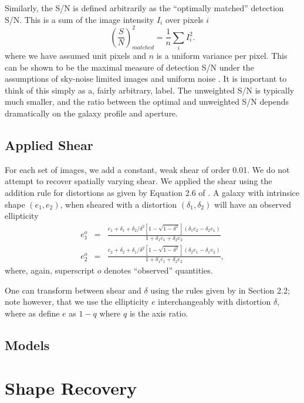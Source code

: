 \documentclass[12pt,preprint]{aastex}
\begin{document}
Similarly, the S/N is defined arbitrarily as the ``optimally matched''
detection S/N.  This is a sum of the image intensity $I_i$ over pixels $i$
\begin{equation}
\left(\frac{S}{N}\right)^2_{matched} = \frac{1}{n} \sum_{i} I_i^2.
\end{equation}
where we have assumed unit pixels and $n$ is a uniform variance per pixel.
This can be shown to be the maximal measure of detection S/N under the
assumptions of sky-noise limited images and uniform noise \citep{plazasthesis}.
It is important to think of this simply as a, fairly arbitrary, label.  The
unweighted S/N is typically much smaller, and the ratio between the optimal and
unweighted S/N depends dramatically on the galaxy profile and aperture.

\subsection{Applied Shear} \label{sec:sim:shear}

For each set of images, we add a constant, weak shear of order 0.01.  We do not
attempt to recover spatially varying shear.  We applied the shear using the
addition rule for distortions as given by Equation 2.6 of
\citet{Escude91}. A galaxy with intrinsice shape $(e_1,e_2)$, when
sheared with a distortion $(\delta_1, \delta_2)$ will have an observed
ellipticity
\begin{eqnarray}
e_1^o  & = & \frac
{e_1 + \delta_1 + \delta_2/\delta^2\left[1 - \sqrt{1-\delta^2}\right]\left( \delta_1 e_2 - \delta_2 e_1\right)}
{1 + \delta_1 e_1 + \delta_2 e_2 } \\
e_2^o  & = & \frac
{e_2 + \delta_2 + \delta_1/\delta^2\left[1 - \sqrt{1-\delta^2}\right]\left( \delta_2 e_1 - \delta_1 e_2\right)}
{1 + \delta_1 e_1 + \delta_2 e_2 },
\end{eqnarray}
where, again, superscript $o$ denotes ``observed'' quantities.

One can transform between shear and $\delta$ using the rules given by
\citet{bern02} in Section 2.2; note however, that we use the ellipticity 
$e$ interchangeably with distortion $\delta$, where as \citet{bern02} define
$e$ as $1-q$ where $q$ is the axis ratio.

\subsection{Models}

\section{Shape Recovery}
\end{document}
